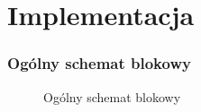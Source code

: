 \section{Implementacja}

\subsubsection{Ogólny schemat blokowy}
\clearpage

\begin{figure}[!ht]
	\caption{\label{fig:flow_chart}Ogólny schemat blokowy}
\end{figure}

